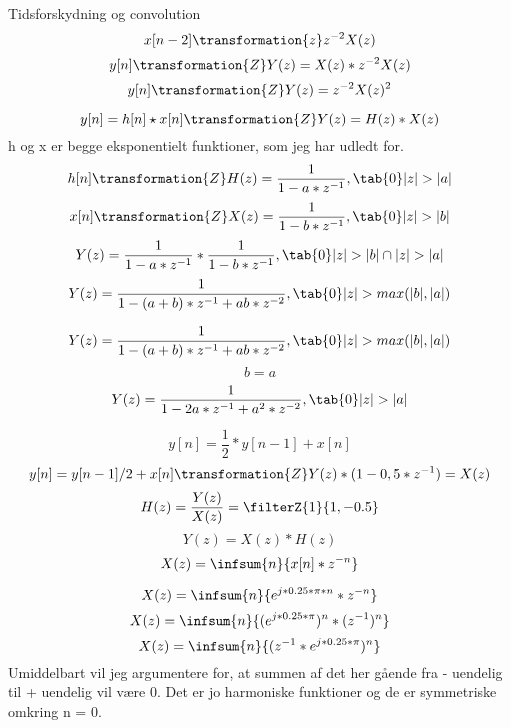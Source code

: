 \begin{Opgaver}
\begin{kapitel}[Z transformation]
\begin{Opgave}
            \begin{UnderOpgave}[\text{y[n] = x[n]*x[n - 2]}]
                Tidsforskydning og convolution
                \[x[n-2] \transformation{z} z^{-2}X(z)\]
                \[y[n] \transformation{Z} Y(z) = X(z)*z^{-2}X(z) \]
                \[y[n] \transformation{Z} Y(z) = z^{-2}X(z)^2 \]
            \end{UnderOpgave}
        \end{Opgave}
        \begin{Opgave}
            \begin{UnderOpgave}[\text{$h[n] = a^nu[n], \tab{0} x[n] = b^nu[n], \tab{0} a\neq b$}]
                \[y[n] = h[n]\star x[n] \transformation{Z} Y(z) = H(z)*X(z)\]
                h og x er begge eksponentielt funktioner, som jeg har udledt for. 
                \[h[n] \transformation{Z} H(z) = \frac{1}{1 -a*z^{-1}}, \tab{0} |z| > |a|\]
                \[x[n] \transformation{Z} X(z) = \frac{1}{1 -b*z^{-1}}, \tab{0} |z| > |b|\]
                \[Y(z) = \frac{1}{1 -a*z^{-1}} * \frac{1}{1 -b*z^{-1}}, \tab{0} |z| > |b| \cap |z| > |a| \]
                \[Y(z) = \frac{1}{1 - (a + b)*z^{-1} + ab*z^{-2}}, \tab{0} |z| > max(|b|, |a|) \]                
            \end{UnderOpgave}
            \begin{UnderOpgave}[\text{$h[n] = a^nu[n],\tab{0} x[n] = b^nu[n],\tab{0} a=b$}]
                \[Y(z) = \frac{1}{1 - (a + b)*z^{-1} + ab*z^{-2}}, \tab{0} |z| > max(|b|, |a|)\]
                \[b = a\]
                \[Y(z) = \frac{1}{1 - 2a*z^{-1} + a^2*z^{-2}}, \tab{0} |z| > |a|\]
                                
            \end{UnderOpgave}
        \end{Opgave}
        \begin{Opgave}
            \[y[n]= \frac{1}{2} * y[n - 1] + x[n]\]
            \[y[n] = y[n-1]/2 + x[n] \transformation{Z} Y(z)*(1 - 0,5*z^{-1}) = X(z)\]
            \[H(z) = \frac{Y(z)}{X(z)} = \filterZ{1}{1, -0.5}\]
            \[Y(z) = X(z)*H(z)\]
            \[X(z) = \infsum{n}{x[n]*z^{-n}}\]

            \begin{UnderOpgave}[\text{$x[n] = e^{j*0.25*\pi * n}, \tab{0} -\infty < n < \infty$}]
                \[X(z) = \infsum{n}{e^{j*0.25*\pi * n}*z^{-n}}\]
                \[X(z) = \infsum{n}{(e^{j*0.25*\pi})^n*(z^{-1})^n}\]
                \[X(z) = \infsum{n}{(z^{-1}*e^{j*0.25*\pi})^n}\]
                Umiddelbart vil jeg argumentere for, at summen af det her gående fra - uendelig til + uendelig vil være 0. 
                Det er jo harmoniske funktioner og de er symmetriske omkring n = 0. \\\\


\end{UnderOpgave}
\end{Opgave}
\end{kapitel}
\end{Opgaver}
